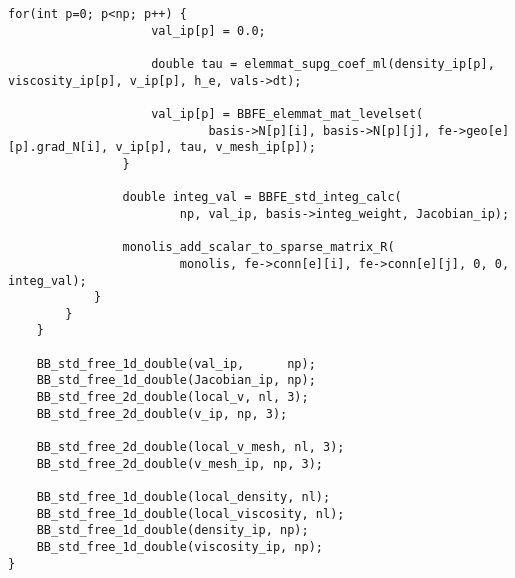 \begin{lstlisting}[caption = mlflow\_fs.cの中のレベルセット関数の係数行列を計算する関数]
				for(int p=0; p<np; p++) {
					val_ip[p] = 0.0;

					double tau = elemmat_supg_coef_ml(density_ip[p], viscosity_ip[p], v_ip[p], h_e, vals->dt);

					val_ip[p] = BBFE_elemmat_mat_levelset(
							basis->N[p][i], basis->N[p][j], fe->geo[e][p].grad_N[i], v_ip[p], tau, v_mesh_ip[p]);
				}

				double integ_val = BBFE_std_integ_calc(
						np, val_ip, basis->integ_weight, Jacobian_ip);

				monolis_add_scalar_to_sparse_matrix_R(
						monolis, fe->conn[e][i], fe->conn[e][j], 0, 0, integ_val);
			}
		}
	}

	BB_std_free_1d_double(val_ip,      np);
	BB_std_free_1d_double(Jacobian_ip, np);
	BB_std_free_2d_double(local_v, nl, 3);
	BB_std_free_2d_double(v_ip, np, 3);

	BB_std_free_2d_double(local_v_mesh, nl, 3);
	BB_std_free_2d_double(v_mesh_ip, np, 3);

	BB_std_free_1d_double(local_density, nl);
	BB_std_free_1d_double(local_viscosity, nl);
	BB_std_free_1d_double(density_ip, np);
	BB_std_free_1d_double(viscosity_ip, np);
}
\end{lstlisting}

